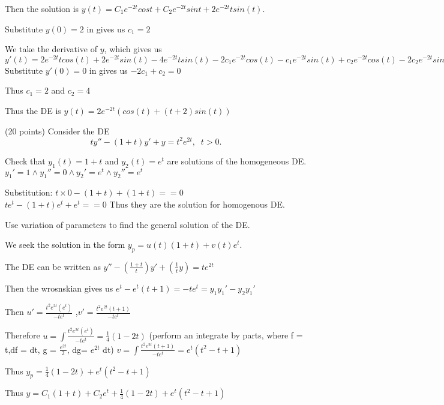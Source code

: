 Then the solution is $y(t) = C_1e^{-2t}cost+C_2e^{-2t}sint + 2e^{-2t}tsin(t)$.

Substitute $y(0) = 2$ in gives us $c_1 = 2$

We take the derivative of $y$, which gives us $y'(t) = 2e^{-2t}tcos(t)+2e^{-2t}sin(t)-4e^{-2t}tsin(t)-2c_1e^{-2t}cos(t)-c_1e^{-2t}sin(t)+c_2e^{-2t}cos(t)-2c_2e^{-2t}sin(t)$ 
Substitute $y'(0) = 0$ in gives us $-2c_1+c_2 = 0$

Thus $c_1 = 2$ and $c_2 = 4$

Thus the DE is $y(t) = 2e^{-2t}(cos(t)+(t+2)sin(t))$

\newpage

\item (20 points)  Consider the DE
\begin{equation*}
ty'' - (1+t) y' + y = t^2 e^{2t}, \;\; t>0.		
\end{equation*}
\benum
\item Check that $y_1(t) = 1+t$ and $y_2(t) = e^t$ are solutions of the homogeneous DE.
$y_1' = 1 \land y_1'' = 0 \land y_2' = e^t \land y_2'' = e^t$

Substitution:
	$t \times 0 -(1+t)+(1+t) == 0$\\
	$te^t-(1+t)e^t+e^t == 0$
Thus they are the solution for homogenous DE.
\item Use variation of parameters to find the general solution of the DE.

We seek the solution in the form $y_p=u(t)(1+t)+v(t)e^t$.

The DE can be written as $y''-(\frac{1+t}{t})y'+(\frac{1}{t}y) = te^{2t}$

Then the wrosnskian gives us $e^t-e^t(t+1) = -te^t = y_1y_1'-y_2y_1'$

Then $u' = \frac{t^2e^{2t}(e^t)}{-te^{t}}$
,$v' = \frac{t^2e^{2t}(t+1)}{-te^{t}}$

Therefore $u = \int \frac{t^2e^{2t}(e^t)}{-te^{t}} = \frac{1}{4}(1-2t)$ (perform an integrate by parts, where f = t,df = dt, g = $\frac{e^{2t}}{2}$, dg= $e^{2t}$ dt)
$v = \int \frac{t^2e^{2t}(t+1)}{-te^{t}} = e^t(t^2-t+1)$

Thus $y_p = \frac{1}{4}(1-2t)+e^t(t^2-t+1)$

Thus $y = C_1(1+t)+C_2e^t+ \frac{1}{4}(1-2t)+e^t(t^2-t+1)$  


\eenum

\eenum




